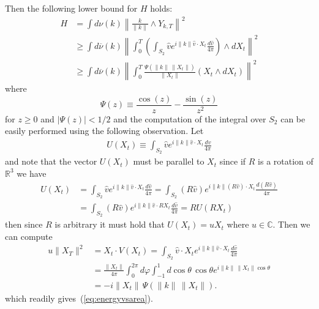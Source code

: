 Then the following lower bound for $H$ holds:
\begin{equation}
\begin{split}
H  
& =
\int d\nu(k)
\left\| \frac{k}{\|k\|}  \wedge Y_{k,T}\right\|^{2} \\
& \ge
\int d\overline{\nu}(k)
\left\|\int_{0}^{T} \left( \int_{S_2} \hat{v} e^{i \|k\| \hat{v} \cdot X_t}
    \frac{d\hat{v}}{4\pi} \right) \wedge dX_t
\right\|^{2} 
\\
 & \ge
\int d\overline{\nu}(k)
\left\|\int_{0}^{T} \frac{\Psi(\|k\|\,\|X_t\|)}{\|X_t\|}  (X_t \wedge dX_t)
\right\|^{2} 
\label{eq:energyvsarea}
\end{split}
\end{equation}
where
$$
\Psi(z) \equiv \frac{\cos(z)}{z} - \frac{\sin(z)}{z^2}
$$
for $z \ge 0$ and $|\Psi(z)| < 1/2$ and the computation of the integral over
$S_2$ can be easily performed using the following observation. Let
\begin{equation*}
\begin{split}
U(X_t) \equiv \int_{S_2} \hat{v} e^{i \|k\| \hat{v} \cdot X_t}
    \frac{d\hat{v}}{4\pi} 
\end{split}
\end{equation*}
and note that the vector $U(X_t)$ must be parallel to $X_t$ 
since if $R$ is a rotation of $\mathbb{R}^3$ we have 
\begin{equation*}
\begin{split}
U(X_t) & = \int_{S_2} \hat{v} e^{i \|k\| \hat{v} \cdot X_t}
    \frac{d\hat{v}}{4\pi} =
 \int_{S_2} (R \hat{v}) e^{i \|k\| (R\hat{v}) \cdot X_t}
    \frac{d (R \hat{v})}{4\pi} \\
& = \int_{S_2} (R \hat{v}) e^{i \|k\| \hat{v} \cdot R X_t}
    \frac{d \hat{v}}{4\pi} 
= R U(R X_t) 
\end{split}
\end{equation*}
then since $R$ is arbitrary it must hold that $U(X_t) = u X_t$ where $u \in
\mathbb{C}$. Then we can compute
\begin{equation*}
\begin{split}
u \|X_T\|^2 & = X_t \cdot V(X_t) = \int_{S_2} \hat{v}\cdot X_t e^{i \|k\|
  \hat{v} \cdot X_t} \frac{d\hat{v}}{4\pi} 
\\ & = \frac{\|X_t\|}{4\pi} \int_0^{2\pi} d\varphi \int_{-1}^1 d\!\cos \theta\, 
 \cos \theta e^{i \|k\|\,
  \|X_t\| \cos \theta } 
\\ & = -i \|X_t\|\, \Psi(\|k\|\, \|X_t\|).
\end{split}
\end{equation*}
which readily gives~(\ref{eq:energyvsarea}). 

